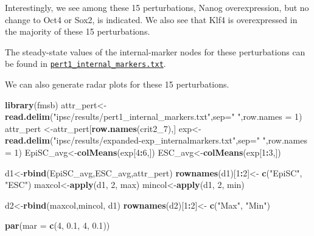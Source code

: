 \documentclass[
]{book}
\newenvironment{Shaded}{\begin{snugshade}}{\end{snugshade}}
\newcommand{\DataTypeTok}[1]{\textcolor[rgb]{0.13,0.29,0.53}{#1}}
\newcommand{\DecValTok}[1]{\textcolor[rgb]{0.00,0.00,0.81}{#1}}
\newcommand{\FloatTok}[1]{\textcolor[rgb]{0.00,0.00,0.81}{#1}}
\newcommand{\KeywordTok}[1]{\textcolor[rgb]{0.13,0.29,0.53}{\textbf{#1}}}
\newcommand{\NormalTok}[1]{#1}
\newcommand{\OperatorTok}[1]{\textcolor[rgb]{0.81,0.36,0.00}{\textbf{#1}}}
\newcommand{\StringTok}[1]{\textcolor[rgb]{0.31,0.60,0.02}{#1}}
\begin{document}
Interestingly, we see among these 15 perturbations, Nanog overexpression, but no change to Oct4 or Sox2, is indicated. We also see that Klf4 is overexpressed in the majority of these 15 perturbations.

The steady-state values of the internal-marker nodes for these perturbations can be found in \href{https://github.com/VeraLiconaResearchGroup/Netisce/blob/main/ipsc_validation/results/pert1_internal_markers.txt}{\texttt{pert1\_internal\_markers.txt}}.

We can also generate radar plots for these 15 perturbations.

\begin{Shaded}
\begin{Highlighting}[]
\KeywordTok{library}\NormalTok{(fmsb)}
\NormalTok{attr_pert<-}\KeywordTok{read.delim}\NormalTok{(}\StringTok{"ipsc/results/pert1_internal_markers.txt"}\NormalTok{,}\DataTypeTok{sep=}\StringTok{" "}\NormalTok{,}\DataTypeTok{row.names =} \DecValTok{1}\NormalTok{)}
\NormalTok{attr_pert <-attr_pert[}\KeywordTok{row.names}\NormalTok{(crit2_}\DecValTok{7}\NormalTok{),]}
\NormalTok{exp<-}\KeywordTok{read.delim}\NormalTok{(}\StringTok{"ipsc/results/expanded-exp_internalmarkers.txt"}\NormalTok{,}\DataTypeTok{sep=}\StringTok{" "}\NormalTok{,}\DataTypeTok{row.names =} \DecValTok{1}\NormalTok{)}
\NormalTok{EpiSC_avg<-}\KeywordTok{colMeans}\NormalTok{(exp[}\DecValTok{4}\OperatorTok{:}\DecValTok{6}\NormalTok{,])}
\NormalTok{ESC_avg<-}\KeywordTok{colMeans}\NormalTok{(exp[}\DecValTok{1}\OperatorTok{:}\DecValTok{3}\NormalTok{,])}

\NormalTok{d1<-}\KeywordTok{rbind}\NormalTok{(EpiSC_avg,ESC_avg,attr_pert)}
\KeywordTok{rownames}\NormalTok{(d1)[}\DecValTok{1}\OperatorTok{:}\DecValTok{2}\NormalTok{]<-}\StringTok{ }\KeywordTok{c}\NormalTok{(}\StringTok{"EpiSC"}\NormalTok{, }\StringTok{"ESC"}\NormalTok{)}
\NormalTok{maxcol<-}\KeywordTok{apply}\NormalTok{(d1, }\DecValTok{2}\NormalTok{, max)}
\NormalTok{mincol<-}\KeywordTok{apply}\NormalTok{(d1, }\DecValTok{2}\NormalTok{, min)}

\NormalTok{d2<-}\KeywordTok{rbind}\NormalTok{(maxcol,mincol, d1)}
\KeywordTok{rownames}\NormalTok{(d2)[}\DecValTok{1}\OperatorTok{:}\DecValTok{2}\NormalTok{]<-}\StringTok{ }\KeywordTok{c}\NormalTok{(}\StringTok{"Max"}\NormalTok{, }\StringTok{"Min"}\NormalTok{)}

\KeywordTok{par}\NormalTok{(}\DataTypeTok{mar =} \KeywordTok{c}\NormalTok{(}\DecValTok{4}\NormalTok{, }\FloatTok{0.1}\NormalTok{, }\DecValTok{4}\NormalTok{, }\FloatTok{0.1}\NormalTok{))}


\end{Highlighting}
\end{Shaded}
\end{document}
